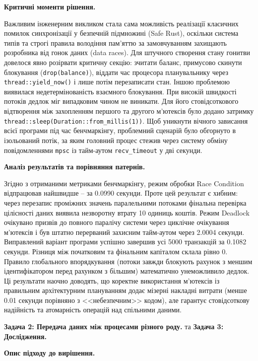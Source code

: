 \documentclass[14pt, a4paper]{extreport}
\begin{document}
	\textbf{Критичні моменти рішення.}
	
	Важливим інженерним викликом стала сама можливість реалізації класичних помилок синхронізації у безпечній підмножині (Safe Rust), оскільки система типів та строгі правила володіння пам'яттю за замовчуванням захищають розробника від гонок даних (data races). Для штучного створення стану гонитви довелося явно розірвати критичну секцію: зчитати баланс, примусово скинути блокування (\texttt{drop(balance)}), віддати час процесора планувальнику через \texttt{thread::yield\_now()} і лише потім перезаписати стан. Іншою проблемою виявилася недетермінованість взаємного блокування. При високій швидкості потоків дедлок міг випадковим чином не виникати. Для його стовідсоткового відтворення між захопленням першого та другого м'ютексів було додано затримку \texttt{thread::sleep(Duration::from\_millis(1))}. Щоб уникнути вічного зависання всієї програми під час бенчмаркінгу, проблемний сценарій було обгорнуто в ізольований потік, за яким головний процес стежив через систему обміну повідомленнями \texttt{mpsc} із тайм-аутом \texttt{recv\_timeout} у дві секунди.
	
	\textbf{Аналіз результатів та порівняння патернів.}
	
	Згідно з отриманими метриками бенчмаркінгу, режим обробки Race Condition відпрацював найшвидше -- за 0.0990 секунди. Проте цей результат є хибним: через перезапис проміжних значень паралельними потоками фінальна перевірка цілісності даних виявила незворотну втрату 10 одиниць коштів. Режим Deadlock очікувано призвів до повного паралічу системи через циклічне очікування м'ютексів і був штатно перерваний захисним тайм-аутом через 2.0004 секунди. Виправлений варіант програми успішно завершив усі 5000 транзакцій за 0.1082 секунди. Різниця між початковим та фінальним капіталом склала рівно 0. Правило глобального впорядкування (потоки завжди блокують рахунок з меншим ідентифікатором перед рахунком з більшим) математично унеможливило дедлок. Ці результати наочно доводять, що коректне використання м'ютексів із правильним архітектурним плануванням додає мізерні накладні витрати (менше 0.01 секунди порівняно з <<небезпечним>> кодом), але гарантує стовідсоткову надійність та атомарність операцій над спільними даними.
	
	
	\textbf{Задача 2: Передача даних між процесами різного роду.} та \textbf{Задача 3: Дослідження.}
	
	\textbf{Опис підходу до вирішення.}
	
\end{document}
